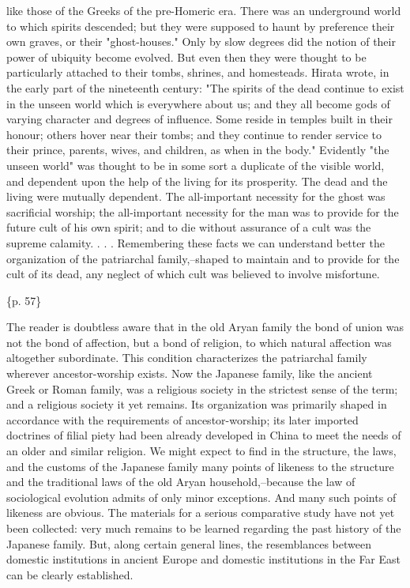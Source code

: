 like those of the Greeks of the pre-Homeric era. There was an underground world to which spirits descended; but they were supposed to haunt by preference their own graves, or their "ghost-houses." Only by slow degrees did the notion of their power of ubiquity become evolved. But even then they were thought to be particularly attached to their tombs, shrines, and homesteads. Hirata wrote, in the early part of the nineteenth century: "The spirits of the dead continue to exist in the unseen world which is everywhere about us; and they all become gods of varying character and degrees of influence. Some reside in temples built in their honour; others hover near their tombs; and they continue to render service to their prince, parents, wives, and children, as when in the body." Evidently "the unseen world" was thought to be in some sort a duplicate of the visible world, and dependent upon the help of the living for its prosperity. The dead and the living were mutually dependent. The all-important necessity for the ghost was sacrificial worship; the all-important necessity for the man was to provide for the future cult of his own spirit; and to die without assurance of a cult was the supreme calamity. . . . Remembering these facts we can understand better the organization of the patriarchal family,--shaped to maintain and to provide for the cult of its dead, any neglect of which cult was believed to involve misfortune.

\{p. 57\}

The reader is doubtless aware that in the old Aryan family the bond of union was not the bond of affection, but a bond of religion, to which natural affection was altogether subordinate. This condition characterizes the patriarchal family wherever ancestor-worship exists. Now the Japanese family, like the ancient Greek or Roman family, was a religious society in the strictest sense of the term; and a religious society it yet remains. Its organization was primarily shaped in accordance with the requirements of ancestor-worship; its later imported doctrines of filial piety had been already developed in China to meet the needs of an older and similar religion. We might expect to find in the structure, the laws, and the customs of the Japanese family many points of likeness to the structure and the traditional laws of the old Aryan household,--because the law of sociological evolution admits of only minor exceptions. And many such points of likeness are obvious. The materials for a serious comparative study have not yet been collected: very much remains to be learned regarding the past history of the Japanese family. But, along certain general lines, the resemblances between domestic institutions in ancient Europe and domestic institutions in the Far East can be clearly established.



